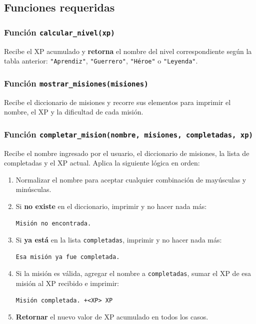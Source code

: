 \subsection*{{\small \faCogs}\; Funciones requeridas}

\subsubsection*{Función \texttt{calcular\_nivel(xp)}}

Recibe el XP acumulado y \textbf{retorna} el nombre del nivel correspondiente según la tabla anterior:
\texttt{"Aprendiz"}, \texttt{"Guerrero"}, \texttt{"Héroe"} o \texttt{"Leyenda"}.

\subsubsection*{Función \texttt{mostrar\_misiones(misiones)}}

Recibe el diccionario de misiones y recorre sus elementos para imprimir el nombre, el XP y la dificultad de cada misión.

\subsubsection*{Función \texttt{completar\_mision(nombre, misiones, completadas, xp)}}

Recibe el nombre ingresado por el usuario, el diccionario de misiones, la lista de completadas y el XP actual.
Aplica la siguiente lógica en orden:

\begin{enumerate}
    \item Normalizar el nombre para aceptar cualquier combinación de mayúsculas y minúsculas.
    \item Si \textbf{no existe} en el diccionario, imprimir y no hacer nada más:
    \begin{verbatim}
Misión no encontrada.
    \end{verbatim}
    \item Si \textbf{ya está} en la lista \texttt{completadas}, imprimir y no hacer nada más:
    \begin{verbatim}
Esa misión ya fue completada.
    \end{verbatim}
    \item Si la misión es válida, agregar el nombre a \texttt{completadas}, sumar el XP de esa misión al XP recibido e imprimir:
    \begin{verbatim}
Misión completada. +<XP> XP
    \end{verbatim}
    \item \textbf{Retornar} el nuevo valor de XP acumulado en todos los casos.
\end{enumerate}

